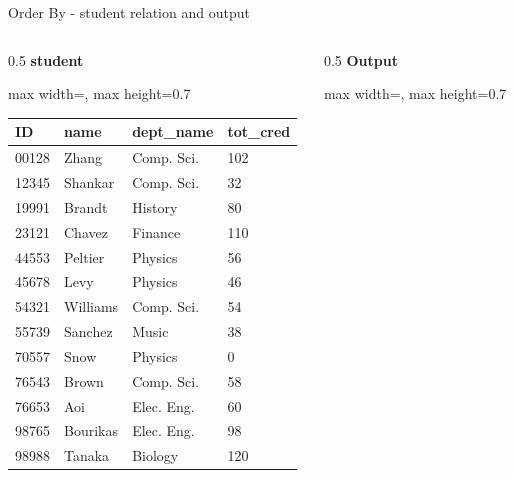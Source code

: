 \documentclass[aspectratio=169, xcolor=dvipsnames]{beamer}
\begin{document}
\begin{frame}[fragile]{Order By - student relation and output}
    \begin{columns}
        \begin{column}{0.5\textwidth}
            \textbf{student}
            \begin{center}
                \begin{adjustbox}{max width=\textwidth, max height=0.7\textheight}
                \begin{tabular}{|l|l|l|l|}
                \hline
                \textbf{ID} & \textbf{name} & \textbf{dept\_name} & \textbf{tot\_cred} \\ \hline
                00128 & Zhang & Comp. Sci. & 102 \\ \hline
                12345 & Shankar & Comp. Sci. & 32 \\ \hline
                19991 & Brandt & History & 80 \\ \hline
                23121 & Chavez & Finance & 110 \\ \hline
                44553 & Peltier & Physics & 56 \\ \hline
                45678 & Levy & Physics & 46 \\ \hline
                54321 & Williams & Comp. Sci. & 54 \\ \hline
                55739 & Sanchez & Music & 38 \\ \hline
                70557 & Snow & Physics & 0 \\ \hline
                76543 & Brown & Comp. Sci. & 58 \\ \hline
                76653 & Aoi & Elec. Eng. & 60 \\ \hline
                98765 & Bourikas & Elec. Eng. & 98 \\ \hline
                98988 & Tanaka & Biology & 120 \\ \hline
                \end{tabular}
                \end{adjustbox}
            \end{center}
        \end{column}
        \begin{column}{0.5\textwidth}
            \textbf{Output}
            \begin{center}
                \begin{adjustbox}{max width=\textwidth, max height=0.7\textheight}
                \begin{tabular}{|l|l|l|}

\end{tabular}
\end{adjustbox}
\end{center}
\end{column}
\end{columns}
\end{frame}
\end{document}
